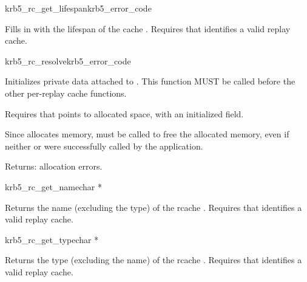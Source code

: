 \begin{funcdecl}{krb5_rc_get_lifespan}{krb5_error_code}{\funcin}
\funcout
{}
\end{funcdecl}
Fills in  with the lifespan of
the cache .
Requires that  identifies a valid replay cache.

\begin{funcdecl}{krb5_rc_resolve}{krb5_error_code}{\funcinout}
\funcin
{}
\end{funcdecl}

Initializes private data attached to .  This function MUST
be called before the other per-replay cache functions.

Requires that  points to allocated space, with an
initialized  field.

Since  allocates memory,
 must be called to free the allocated memory,
even if neither  or
 were successfully called by the application.

Returns:  allocation errors.


\begin{funcdecl}{krb5_rc_get_name}{char *}{\funcin}
\end{funcdecl}

Returns the name (excluding the type) of the rcache .
Requires that  identifies a valid replay cache.

\begin{funcdecl}{krb5_rc_get_type}{char *}{\funcin}
\end{funcdecl}

Returns the type (excluding the name) of the rcache .
Requires that  identifies a valid replay cache.



